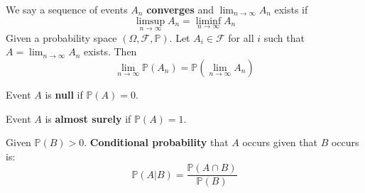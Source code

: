 \documentclass{huhtakm-template-book}
\newcommand{\prob}{\mathbb{P}}
\begin{document}
    \begin{sdefn}
        We say a sequence of events $A_{n}$ \textbf{converges} and $\lim_{n\to\infty}A_{n}$ exists if
        \begin{equation*}
            \limsup_{n\to\infty}A_{n}=\liminf_{n\to\infty}A_{n}
        \end{equation*}
        Given a probability space $(\Omega,\mathcal{F},\prob)$. Let $A_{i}\in\mathcal{F}$ for all $i$ such that $A=\lim_{n\to\infty}A_{n}$ exists. Then
        \begin{equation*}
            \lim_{n\to\infty}\prob(A_{n})=\prob\left(\lim_{n\to\infty}A_{n}\right)
        \end{equation*}
    \end{sdefn}
    \begin{sdefn}
        Event $A$ is \textbf{null} if $\prob(A)=0$.
    \end{sdefn}
    \begin{sdefn}
        Event $A$ is \textbf{almost surely} if $\prob(A)=1$.
    \end{sdefn}
    \begin{sdefn}
        Given $\prob(B)>0$. \textbf{Conditional probability} that $A$ occurs given that $B$ occurs is:
        \begin{equation*}
            \prob(A|B)=\frac{\prob(A\cap B)}{\prob(B)}
        \end{equation*}
    \end{sdefn}
\end{document}
